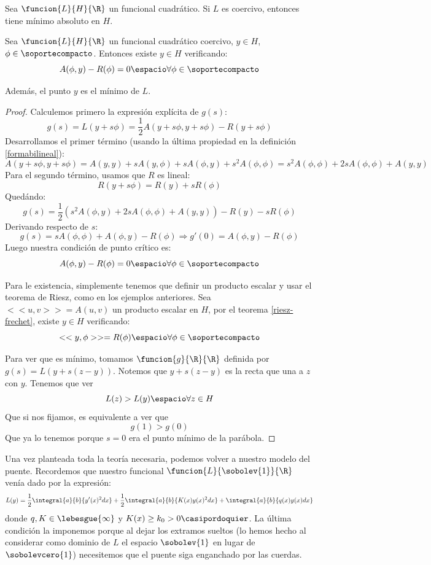 \begin{theorem}
\label{laxmilgran}
Sea $\funcion{L}{H}{\R}$ un funcional cuadrático. Si $L$ es coercivo, entonces tiene mínimo absoluto en $H$.
\end{theorem}

\begin{prop}
\label{puntocritico}
Sea $\funcion{L}{H}{\R}$ un funcional cuadrático coercivo, $y\in H$, $\phi\in\soportecompacto$. Entonces existe $y\in H$ verificando:
\[
A(\phi,y)-R(\phi)=0 \espacio \forall\phi\in\soportecompacto
\]

Además, el punto $y$ es el mínimo de $L$.
\end{prop}
\begin{proof}
Calculemos primero la expresión explícita de $g(s)$:
\[
g(s)=L(y+s\phi)=\frac{1}{2}A(y+s\phi,y+s\phi)-R(y+s\phi)
\]
Desarrollamos el primer término (usando la última propiedad en la definición \ref{formabilineal}):
\[
A(y+s\phi,y+s\phi)=A(y,y)+sA(y,\phi)+sA(\phi,y)+s^2A(\phi,\phi)=s^2A(\phi,\phi)+2sA(\phi,\phi)+A(y,y)
\]
Para el segundo término, usamos que $R$ es lineal:
\[
R(y+s\phi)=R(y)+sR(\phi)
\]
Quedándo:
\[
g(s)=\frac{1}{2}\left(s^2A(\phi,y)+2sA(\phi,\phi)+A(y,y)\right)-R(y)-sR(\phi)
\]
Derivando respecto de $s$:
\[
g(s)=sA(\phi,\phi)+A(\phi,y)-R(\phi) \Rightarrow g'(0)=A(\phi,y)-R(\phi)
\]
Luego nuestra condición de punto crítico es:
\[
A(\phi,y)-R(\phi)=0 \espacio \forall\phi\in\soportecompacto
\]

Para le existencia, simplemente tenemos que definir un producto escalar y usar el teorema de Riesz, como en los ejemplos anteriores. Sea $<<u,v>>=A(u,v)$ un producto escalar en $H$, por el teorema \ref{riesz-frechet}, existe $y\in H$ verificando:
\[
<<y,\phi>>=R(\phi) \espacio \forall \phi\in\soportecompacto
\]

Para ver que es mínimo, tomamos $\funcion{g}{\R}{\R}$ definida por $g(s)=L(y+s(z-y))$. Notemos que $y+s(z-y)$ es la recta que una a $z$ con $y$. Tenemos que ver
\[
L(z)>L(y) \espacio \forall z\in H
\]
Que si nos fijamos, es equivalente a ver que
\[
g(1)>g(0)
\]
Que ya lo tenemos porque $s=0$ era el punto mínimo de la parábola.
\end{proof}

Una vez planteada toda la teoría necesaria, podemos volver a nuestro modelo del puente. Recordemos que nuestro funcional  $\funcion{L}{\sobolev{1}}{\R}$ venía dado por la expresión:
\[
L(y)=\frac{1}{2}\integral{a}{b}{y'(x)^2dx}+\frac{1}{2}\integral{a}{b}{K(x)y(x)^2dx}+\integral{a}{b}{q(x)y(x)dx}
\]
donde $q,K\in\lebesgue{\infty}$ y $K(x)\geq k_0 >0\casipordoquier$. La última condición la imponemos porque al dejar los extramos sueltos (lo hemos hecho al considerar como dominio de $L$ el espacio $\sobolev{1}$ en lugar de $\sobolevcero{1}$) necesitemos que el puente siga enganchado por las cuerdas.

